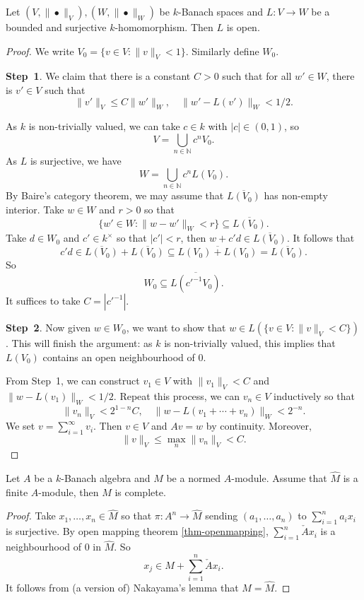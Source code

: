 \begin{thm}\label{thm-openmapping}
    Let $(V,\|\bullet\|_V), (W,\|\bullet\|_W)$ be $k$-Banach spaces and $L:V\rightarrow W$ be a bounded and surjective $k$-homomorphism. Then $L$ is open.   
\end{thm}
\begin{proof}
    We write $V_0=\{v\in V:\|v\|_V<1\}$. Similarly define $W_0$.

    \textbf{Step~1}. We claim that there is a constant $C>0$ such that for all $w'\in W$, there is $v'\in V$ such that 
    \[
        \|v'\|_V\leq  C \|w'\|_W,\quad \|w'-L(v')\|_W<1/2.
    \]

    As $k$ is non-trivially valued, we can take $c\in k$ with $|c|\in (0,1)$, so 
    \[
        V=\bigcup_{n\in \mathbb{N}} c^n V_0.  
    \]
    As $L$ is surjective, we have
    \[
        W=\bigcup_{n\in \mathbb{N}} c^n L(V_0).   
    \]
    By Baire's category theorem, we may assume that $\overline{L(V_0)}$ has non-empty interior. Take $w\in W$ and $r>0$ so that
    \[
        \{w'\in W: \|w-w'\|_W<r\}\subseteq    \overline{L(V_0)}.
    \]
    Take $d\in W_0$ and $c'\in k^{\times}$ so that $|c'|<r$, then $w+c'd\in \overline{L(V_0)}$. It follows that
    \[
        c'd\in   \overline{L(V_0)}+\overline{L(V_0)}\subseteq \overline{L(V_0)+L(V_0)}=\overline{L(V_0)}.
    \]
    So
    \[
        W_0\subseteq  \overline{L(c'^{-1}V_0)}. 
    \]
    It suffices to take $C=|c'^{-1}|$.

    \textbf{Step~2}.
    Now given $w\in W_0$, we want to show that $w\in L(\{v\in V:\|v\|_V<C\})$. 
    This will finish the argument: as $k$ is non-trivially valued, this implies that $L(V_0)$ contains an open neighbourhood of $0$. 
    
    From Step~1, we can construct $v_1\in V$ with $\|v_1\|_V< C$ and $\|w-L(v_1)\|_W<1/2$. Repeat this process, we can $v_n\in V$ inductively so that
    \[
        \|v_n\|_V<  2^{1-n} C,\quad \|w-L(v_1+\cdots+v_n)\|_W<2^{-n}.
    \]
    We set $v=\sum_{i=1}^{\infty} v_i$. Then $v\in V$ and $Av=w$ by continuity. Moreover,
    \[
        \|v\|_V\leq \max_n \|v_n\|_V<C.   
    \]
\end{proof}

\begin{corollary}\label{cor-completionfinitecomplete}
    Let $A$ be a $k$-Banach algebra and $M$ be a normed $A$-module. Assume that $\hat{M}$ is a finite $A$-module, then $M$ is complete.
\end{corollary}
\begin{proof}
    Take $x_1,\ldots,x_n\in \hat{M}$ so that $\pi:A^n\rightarrow \hat{M}$ sending $(a_1,\ldots,a_n)$ to $\sum_{i=1}^n a_ix_i$ is surjective. By open mapping theorem \cref{thm-openmapping}, $\sum_{i=1}^n \check{A}x_i$ is a neighbourhood of $0$ in $\hat{M}$. So
    \[
        x_j\in M+  \sum_{i=1}^n \check{A} x_i.
    \]
    It follows from (a version of) Nakayama's lemma that $M=\hat{M}$.
\end{proof}

